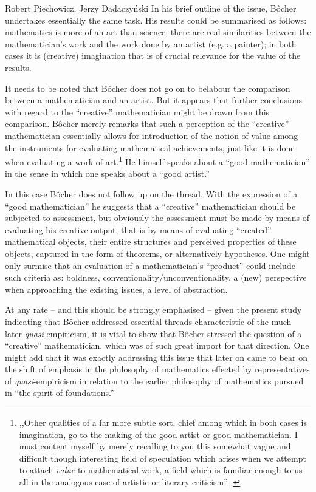 \begin{artengenv}{Robert Piechowicz, Jerzy Dadaczyński}
In his brief outline of the issue, Bôcher undertakes essentially the same task. His results could be summarised as follows: mathematics is more of an art than science; there are real similarities between the mathematician's work and the work done by an artist (e.g. a painter); in both cases it is (creative) imagination that is of crucial relevance for the value of the results.

It needs to be noted that Bôcher does not go on to belabour the comparison between a mathematician and an artist. But it appears that further conclusions with regard to the ``creative'' mathematician might be drawn from this comparison. Bôcher merely remarks that such a perception of the ``creative'' mathematician essentially allows for introduction of the notion of value among the instruments for evaluating mathematical achievements, just like it is done when evaluating a work of art.\footnote{,,Other qualities of a far more subtle sort, chief among which in both cases is imagination, go to the making of the good artist or good mathematician. I must content myself by merely recalling to you this somewhat vague and difficult though interesting field of speculation which arises when we attempt to attach \textit{value} to mathematical work, a field which is familiar enough to us all in the analogous case of artistic or literary criticism''
\parencite[][p.133]{bocher_fundamental_1904}.%
} He himself speaks about a ``good mathematician'' in the sense in which one speaks about a ``good artist.''

In this case Bôcher does not follow up on the thread. With the expression of a ``good mathematician'' he suggests that a ``creative'' mathematician should be subjected to assessment, but obviously the assessment must be made by means of evaluating his creative output, that is by means of evaluating ``created'' mathematical objects, their entire structures and perceived properties of these objects, captured in the form of theorems, or alternatively hypotheses. One might only surmise that an evaluation of a mathematician's ``product'' could include such criteria as: boldness, conventionality/unconventionality, a (new) perspective when approaching the existing issues, a level of abstraction.

At any rate -- and this should be strongly emphasised -- given the present study indicating that Bôcher addressed essential threads characteristic of the much later \textit{quasi}-empiricism, it is vital to show that Bôcher stressed the question of a ``creative'' mathematician, which was of such great import for that direction. One might add that it was exactly addressing this issue that later on came to bear on the shift of emphasis in the philosophy of mathematics effected by representatives of \textit{quasi}-empiricism in relation to the earlier philosophy of mathematics pursued in ``the spirit of foundations.''


\end{artengenv}

